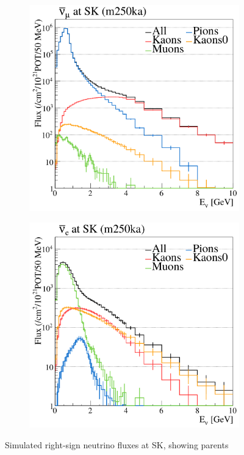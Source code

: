 \begin{figure}[h]
	\begin{subfigure}[t]{0.32\textwidth}
		\includegraphics[width=\textwidth, trim={0mm 0mm 0mm 0mm}, clip,page=1]{figures/det_chap/beam/numubar_sk_parents}
	\end{subfigure}
	\begin{subfigure}[t]{0.32\textwidth}
		\includegraphics[width=\textwidth, trim={0mm 0mm 0mm 0mm}, clip,page=1]{figures/det_chap/beam/nuebar_sk_parents}
	\end{subfigure}
	\caption{Simulated right-sign neutrino fluxes at SK, showing parents}
	\label{fig:flux_parents}
\end{figure}

